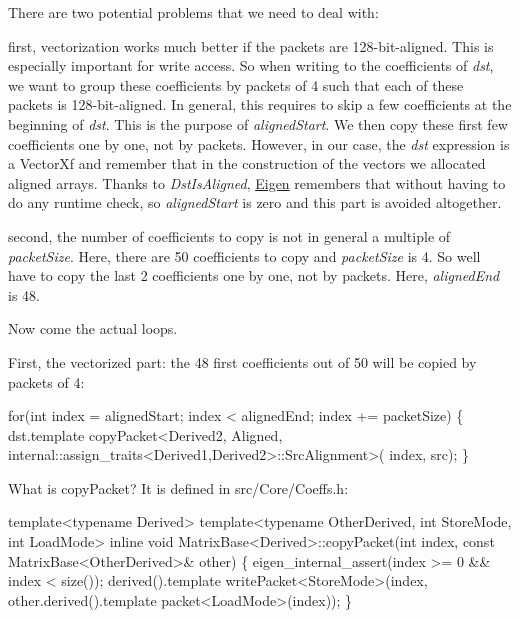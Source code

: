 There are two potential problems that we need to deal with\+: \begin{DoxyItemize}
\item first, vectorization works much better if the packets are 128-\/bit-\/aligned. This is especially important for write access. So when writing to the coefficients of {\itshape dst}, we want to group these coefficients by packets of 4 such that each of these packets is 128-\/bit-\/aligned. In general, this requires to skip a few coefficients at the beginning of {\itshape dst}. This is the purpose of {\itshape aligned\+Start}. We then copy these first few coefficients one by one, not by packets. However, in our case, the {\itshape dst} expression is a Vector\+Xf and remember that in the construction of the vectors we allocated aligned arrays. Thanks to {\itshape Dst\+Is\+Aligned}, \hyperlink{namespace_eigen}{Eigen} remembers that without having to do any runtime check, so {\itshape aligned\+Start} is zero and this part is avoided altogether. \item second, the number of coefficients to copy is not in general a multiple of {\itshape packet\+Size}. Here, there are 50 coefficients to copy and {\itshape packet\+Size} is 4. So we\textquotesingle{}ll have to copy the last 2 coefficients one by one, not by packets. Here, {\itshape aligned\+End} is 48.\end{DoxyItemize}
Now come the actual loops.

First, the vectorized part\+: the 48 first coefficients out of 50 will be copied by packets of 4\+: 
\begin{DoxyCode}
\textcolor{keywordflow}{for}(\textcolor{keywordtype}{int} index = alignedStart; index < alignedEnd; index += packetSize)
\{
  dst.template copyPacket<Derived2, Aligned, internal::assign\_traits<Derived1,Derived2>::SrcAlignment>(
      index, src);
\}
\end{DoxyCode}


What is copy\+Packet? It is defined in src/\+Core/\+Coeffs.\+h\+: 
\begin{DoxyCode}
\textcolor{keyword}{template}<\textcolor{keyword}{typename} Derived>
\textcolor{keyword}{template}<\textcolor{keyword}{typename} OtherDerived, \textcolor{keywordtype}{int} StoreMode, \textcolor{keywordtype}{int} LoadMode>
\textcolor{keyword}{inline} \textcolor{keywordtype}{void} MatrixBase<Derived>::copyPacket(\textcolor{keywordtype}{int} index, \textcolor{keyword}{const} MatrixBase<OtherDerived>& other)
\{
  eigen\_internal\_assert(index >= 0 && index < size());
  derived().template writePacket<StoreMode>(index,
    other.derived().template packet<LoadMode>(index));
\}
\end{DoxyCode}


